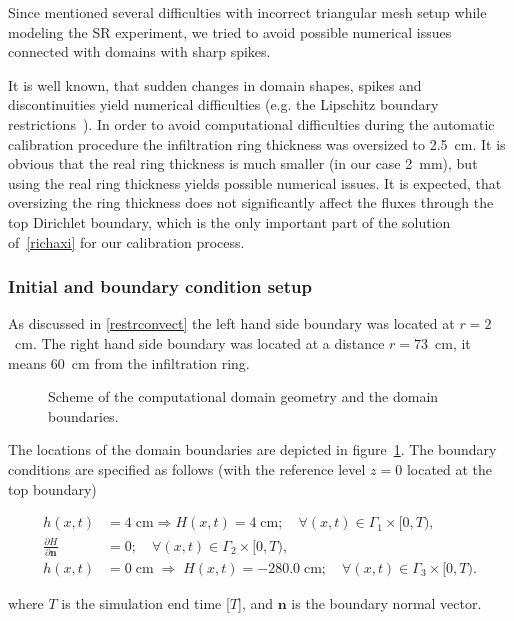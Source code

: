 \documentclass[review]{elsarticle}
\newenvironment{lineq}
    {\begin{linenomath*}
    \begin{equation}
    }
    { 
    \end{equation} 
    \end{linenomath*}
    }
\renewcommand{\vec}{\mathbf}
\begin{document}
Since \cite{Dusek} mentioned several difficulties with incorrect triangular mesh setup while modeling the SR experiment, we tried to avoid possible numerical issues connected with domains with sharp spikes.


It is well known, that sudden changes in domain shapes, spikes and discontinuities yield numerical difficulties (e.g. the Lipschitz boundary restrictions~\citep{braess}).
In order to avoid computational difficulties during the automatic calibration procedure the infiltration ring thickness was oversized  to 2.5~cm. It is obvious that the real ring thickness is much smaller (in our case 2~mm), but using the real ring thickness yields possible numerical issues.  It is expected, that oversizing the ring thickness does not significantly affect the fluxes through the top Dirichlet boundary, which is the only important part of the solution of~\eqref{richaxi} for our calibration process.

\subsubsection{Initial and boundary condition setup}

As discussed in \ref{restrconvect} the left hand side boundary was located at $r=2$~cm. The right hand side boundary was located at a distance $r=73$~cm, it means 60~cm from the infiltration ring. 

 \begin{figure}
\centering
{}
 \caption{Scheme of the computational domain geometry and the domain boundaries.}
 \label{valecbc}
\end{figure}


The locations of the domain boundaries are depicted in figure~\ref{valecbc}. The boundary conditions are specified as follows (with the reference level $z=0$ located at the top boundary)
\begin{lineq} 
\begin{split}
h(x,t) &= 4 \; \mbox{cm} \Rightarrow H(x,t) = 4 \; \mbox{cm}; \quad \forall (x,t) \in \Gamma_1 \times [0,T), \\
\frac{\partial H}{\partial \vec{n}} &= 0; \quad \forall (x,t) \in \Gamma_2 \times [0,T), \\
h(x,t) &= 0  \; \mbox{cm}  \; \Rightarrow \; H(x,t) = -280.0  \; \mbox{cm}; \quad \forall (x,t) \in \Gamma_3 \times [0,T).
\end{split}
\end{lineq}
where $T$ is the simulation end time [$T$], and $\vec{n}$ is the boundary normal vector.
\end{document}
